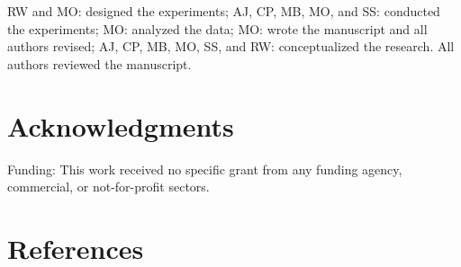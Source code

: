 \documentclass[utf8]{frontiersSCNS}
\begin{document}
RW and MO: designed the experiments; AJ, CP, MB, MO, and SS: conducted
the experiments; MO: analyzed the data; MO: wrote the manuscript and all
authors revised; AJ, CP, MB, MO, SS, and RW: conceptualized the
research. All authors reviewed the manuscript.

\hypertarget{acknowledgments}{%
\section*{Acknowledgments}\label{acknowledgments}}

Funding: This work received no specific grant from any funding agency,
commercial, or not-for-profit sectors.

\hypertarget{references}{%
\section*{References}\label{references}}
\end{document}
